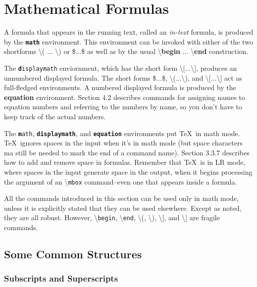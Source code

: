 \documentclass[twocolumn]{book}        %
\begin{document}
\section{Mathematical Formulas}

A formula that appears in the running text, called an {\em in-text} formula, is produced by 
the {\texttt{\textbf{math}}} environment. This environment can be invoked with either of the
two shortforms \textbackslash ( ... \textbackslash ) or \$...\$ as well as by the usual 
\textbackslash {\bf begin} ... \textbackslash {\bf end} construction.

The {\texttt{\textbf displaymath}} enviornment, which has the short form 
\textbackslash [...\textbackslash ], produces an unnumbered displayed formula.
The short forms \$...\$, \textbackslash (...\textbackslash ), and 
\textbackslash [...\textbackslash ] act as full-fledged environments.
A numbered displayed formula is produced by the \textbf{equation} environment.
Section 4.2 describes commands for assigning names to equation numbers and referring
to the numbers by name, so you don't have to keep track of the actual numbers.

The \texttt{\textbf math}, \texttt{\textbf{displaymath}}, and \texttt{\textbf{equation}}
environments put \TeX\ in math mode. \TeX\ ignores spaces in the input when it's in math mode
(but space characters ma still be needed to mark the end of a command name).
Section 3.3.7 describes how to add and remove space in formulas. Remember that
\TeX\ is in LR mode, where spaces in the input generate space in the output,
when it begins processing the argument of an \textbackslash{\tt mbox} command--even 
one that appears inside a formula.

All the commands introduced in this section can be used only in math mode,
unless it is explicitly stated that they can be used elsewhere. Except as noted, they are all robust.
However, \textbackslash{\tt begin}, \textbackslash{\tt end}, \textbackslash (, \textbackslash ),
\textbackslash [, and \textbackslash ] are fragile commands.

\subsection{Some Common Structures}

\subsubsection*{Subscripts and Superscripts}
\end{document}
